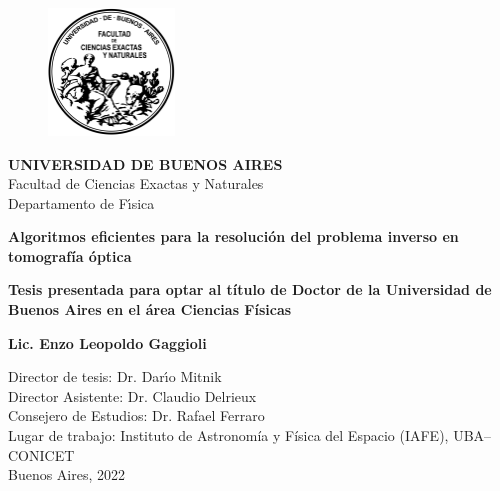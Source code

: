 

\begin{titlepage}
\begin{center}

\begin{figure}[htb]
\center
\includegraphics[width=0.3\textwidth]{figuras/Logo-fcenuba}
\end{figure}
{\bf UNIVERSIDAD DE BUENOS AIRES}\\
Facultad de Ciencias Exactas y Naturales\\
Departamento de F\'{\i}sica

\vspace*{0.5cm}
\begin{Large}
\textbf{Algoritmos eficientes para la resolución 
del problema inverso en tomografía óptica} \\
\end{Large}
\vspace*{0.5cm}
\textbf{Tesis presentada para optar al título de Doctor de la Universidad de 
Buenos Aires en el área Ciencias Físicas}\\

\begin{large}
\textbf{Lic. Enzo Leopoldo Gaggioli}\\
\end{large}

\vspace*{1.0cm}
\begin{flushleft}
Director de tesis: Dr. Dar\'{\i}o Mitnik\\
Director Asistente: Dr. Claudio Delrieux\\
Consejero de Estudios: Dr. Rafael Ferraro\\
\vspace*{0.5cm}
Lugar de trabajo: Instituto de Astronomía y Física del Espacio (IAFE), UBA--CONICET\\
\vspace*{0.5cm}
Buenos Aires, 2022
\end{flushleft}



\end{center}

\end{titlepage}


